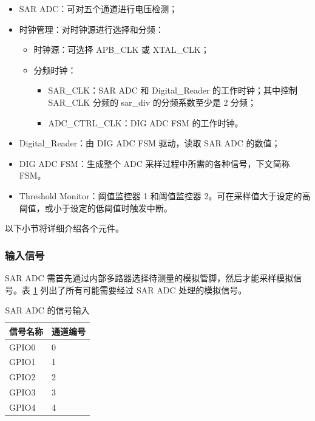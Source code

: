 \documentclass[main\_\_CN.tex]{subfiles}
\begin{document}
\begin{itemize}
    \item SAR ADC：可对五个通道进行电压检测；
    \item 时钟管理：对时钟源进行选择和分频：
        \begin{itemize}
            \item 时钟源：可选择 APB\_CLK 或 XTAL\_CLK；
            \item 分频时钟：
             \begin{itemize}
                 \item SAR\_CLK：SAR ADC 和 Digital\_Reader 的工作时钟；其中控制 SAR\_CLK 分频的 sar\_div 的分频系数至少是 2 分频；
                 \item ADC\_CTRL\_CLK：DIG ADC FSM 的工作时钟。
             \end{itemize}
        \end{itemize}
    \item \label{block:digital-reader0} Digital\_Reader：由 DIG ADC FSM 驱动，读取 SAR ADC 的数值；
    \item DIG ADC FSM：生成整个 ADC 采样过程中所需的各种信号，下文简称 FSM。
    \item Threshold Monitor：阈值监控器 1 和阈值监控器 2。可在采样值大于设定的高阈值，或小于设定的低阈值时触发中断。
\end{itemize}
以下小节将详细介绍各个元件。

\subsubsection{输入信号}

SAR ADC 需首先通过内部多路器选择待测量的模拟管脚，然后才能采样模拟信号。表 \ref{tab:adc-inputs} 列出了所有可能需要经过 SAR ADC 处理的模拟信号。

\begin{table}[H]
    \centering
    \caption{SAR ADC 的信号输入}
    \label{tab:adc-inputs}
    \begin{tabular}[c]{|p{3cm}|p{1.5cm}|}
    \hline
    \rowcolor{lightgray}
    \textbf{信号名称} & \textbf{通道编号} \\
    \hline
    GPIO0       &  0  \\\hline
    GPIO1       &  1  \\\hline
    GPIO2       &  2  \\\hline
    GPIO3       &  3  \\\hline
    GPIO4       &  4  \\\hline
\end{tabular}
\end{table}
\end{document}
